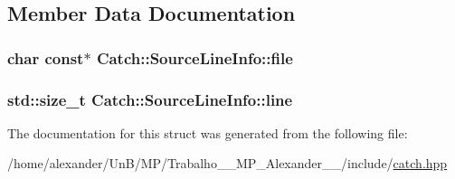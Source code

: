 \subsection{Member Data Documentation}
\hypertarget{structCatch_1_1SourceLineInfo_ad65537703e9f08c1fa7777fbc3f0c617}{
\subsubsection[{file}]{\setlength{\rightskip}{0pt plus 5cm}char const$\ast$ Catch\-::\-Source\-Line\-Info\-::file}}\label{structCatch_1_1SourceLineInfo_ad65537703e9f08c1fa7777fbc3f0c617}
\hypertarget{structCatch_1_1SourceLineInfo_a841e5d696c7b9cde24e45e61dd979c77}{
\subsubsection[{line}]{\setlength{\rightskip}{0pt plus 5cm}std\-::size\-\_\-t Catch\-::\-Source\-Line\-Info\-::line}}\label{structCatch_1_1SourceLineInfo_a841e5d696c7b9cde24e45e61dd979c77}


The documentation for this struct was generated from the following file\-:\begin{DoxyCompactItemize}
\item 
/home/alexander/\-Un\-B/\-M\-P/\-Trabalho\-\_\-\_\-\-M\-P\-\_\-\-Alexander\-\_\-\_/include/\hyperlink{catch_8hpp}{catch.\-hpp}\end{DoxyCompactItemize}
